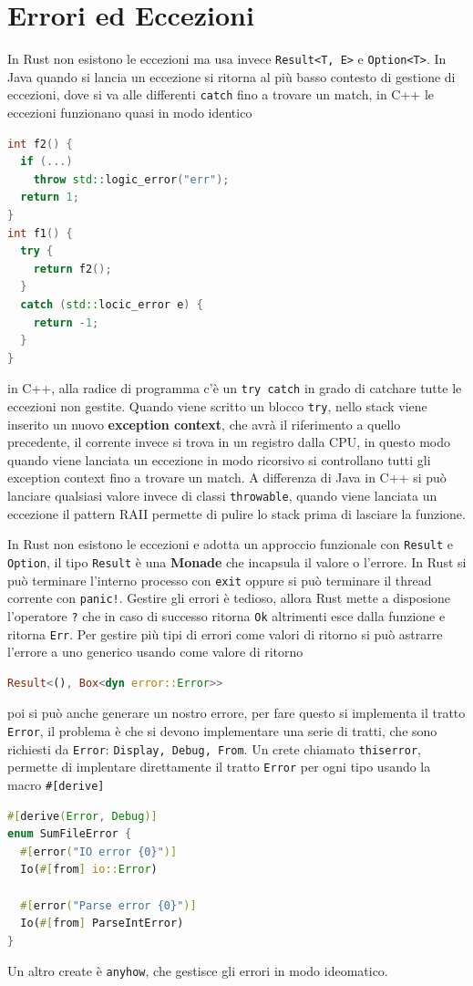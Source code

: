 \documentclass[12pt]{article}
\begin{document}
\section{Errori ed Eccezioni}
In Rust non esistono le eccezioni ma usa invece \texttt{Result<T, E>} e \texttt{Option<T>}. In Java quando si lancia un eccezione si ritorna al pi\`u basso contesto di gestione di eccezioni, dove si va alle differenti \texttt{catch} fino a trovare un match, in C++ le eccezioni funzionano quasi in modo identico
\begin{lstlisting}[language=c++]
int f2() {
  if (...)
    throw std::logic_error("err");
  return 1;
}
int f1() {
  try {
    return f2();
  }
  catch (std::locic_error e) {
    return -1;
  }
}
\end{lstlisting}
in C++, alla radice di programma c'\`e un \texttt{try catch} in grado di catchare tutte le eccezioni non gestite. Quando viene scritto un blocco \texttt{try}, nello stack viene inserito un nuovo \textbf{exception context}, che avr\`a il riferimento a quello precedente, il corrente invece si trova in un registro dalla CPU, in questo modo quando viene lanciata un eccezione in modo ricorsivo si controllano tutti gli exception context fino a trovare un match. A differenza di Java in C++ si pu\`o lanciare qualsiasi valore invece di classi \texttt{throwable}, quando viene lanciata un eccezione il pattern RAII permette di pulire lo stack prima di lasciare la funzione.

In Rust non esistono le eccezioni e adotta un approccio funzionale con \texttt{Result} e \texttt{Option}, il tipo \texttt{Result} 
\`e una \textbf{Monade} che incapsula il valore o l'errore. In Rust si pu\`o terminare l'interno processo con \texttt{exit} oppure si pu\`o terminare il thread corrente con \texttt{panic!}. Gestire gli errori \`e tedioso, allora Rust mette a disposione l'operatore \texttt{?} che in caso di successo ritorna \texttt{Ok} altrimenti esce dalla funzione e ritorna \texttt{Err}. Per gestire pi\`u tipi di errori come valori di ritorno si pu\`o astrarre l'errore a uno generico usando come valore di ritorno
\begin{lstlisting}[language=rust]
Result<(), Box<dyn error::Error>>
\end{lstlisting}
poi si pu\`o anche generare un nostro errore, per fare questo si implementa il tratto \texttt{Error}, il problema \`e che si devono implementare una serie di tratti, che sono richiesti da \texttt{Error}: \texttt{Display, Debug, From}. Un crete chiamato \texttt{thiserror}, permette di implentare direttamente il tratto \texttt{Error} per ogni tipo usando la macro \texttt{#[derive]}
\begin{lstlisting}[language=rust]
#[derive(Error, Debug)]
enum SumFileError {
  #[error("IO error {0}")]
  Io(#[from] io::Error)

  #[error("Parse error {0}")]
  Io(#[from] ParseIntError)
}
\end{lstlisting}
Un altro create \`e \texttt{anyhow}, che gestisce gli errori in modo ideomatico.
\end{document}
